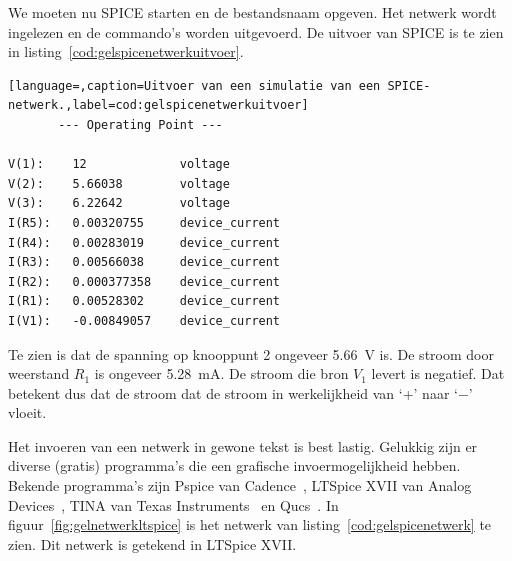 We moeten nu SPICE starten en de bestandsnaam opgeven. Het netwerk wordt ingelezen en de commando's worden uitgevoerd. De uitvoer van SPICE is te zien in listing~\ref{cod:gelspicenetwerkuitvoer}.

\begin{lstlisting}[language=,caption=Uitvoer van een simulatie van een SPICE-netwerk.,label=cod:gelspicenetwerkuitvoer]
       --- Operating Point ---

V(1):	 12	 			voltage
V(2):	 5.66038	 	voltage
V(3):	 6.22642	 	voltage
I(R5):	 0.00320755	 	device_current
I(R4):	 0.00283019	 	device_current
I(R3):	 0.00566038	 	device_current
I(R2):	 0.000377358	device_current
I(R1):	 0.00528302	 	device_current
I(V1):	 -0.00849057	device_current
\end{lstlisting}

Te zien is dat de spanning op knooppunt 2 ongeveer \SI{5.66}{\volt} is. De stroom door weerstand $R_1$ is ongeveer \SI{5.28}{\milli\ampere}. De stroom die bron $V_1$ levert is negatief. Dat betekent dus dat de stroom dat de stroom in werkelijkheid van `+' naar `$-$' vloeit.

Het invoeren van een netwerk in gewone tekst is best lastig. Gelukkig zijn er diverse (gratis) programma's die een grafische invoermogelijkheid hebben. Bekende programma's zijn Pspice van Cadence~\cite{pspice}, LTSpice XVII van Analog Devices~\cite{ltspice}, TINA van Texas Instruments~\cite{tina} en Qucs~\cite{qucs}. In figuur~\ref{fig:gelnetwerkltspice} is het netwerk van listing~\ref{cod:gelspicenetwerk} te zien. Dit netwerk is getekend in LTSpice XVII.

